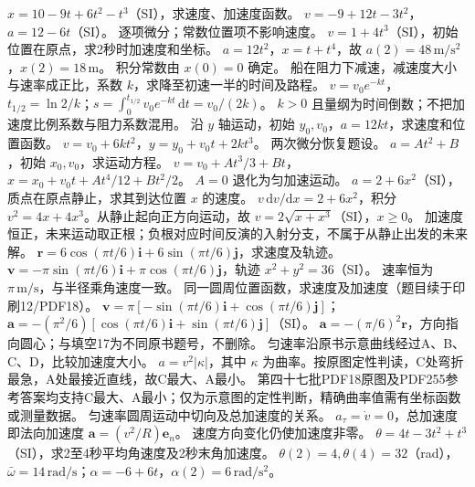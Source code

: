 \problemtext $x=10-9t+6t^2-t^3$（SI），求速度、加速度函数。
\workings $v=-9+12t-3t^2$，$a=12-6t$（SI）。
\crosscheck 逐项微分；常数位置项不影响速度。
\problemtext $v=1+4t^3$（SI），初始位置在原点，求2秒时加速度和坐标。
\workings $a=12t^2$，$x=t+t^4$，故 $a(2)=48\,\mathrm{m/s^2}$，$x(2)=18\,\mathrm m$。
\crosscheck 积分常数由 $x(0)=0$ 确定。
\problemtext 船在阻力下减速，减速度大小与速率成正比，系数 $k$，求降至初速一半的时间及路程。
\workings $v=v_0e^{-kt}$，$t_{1/2}=\ln2/k$；$s=\int_0^{t_{1/2}}v_0e^{-kt}\,\mathrm dt=v_0/(2k)$。
\crosscheck $k>0$ 且量纲为时间倒数；不把加速度比例系数与阻力系数混用。
\problemtext 沿 $y$ 轴运动，初始 $y_0,v_0$，$a=12kt$，求速度和位置函数。
\workings $v=v_0+6kt^2$，$y=y_0+v_0t+2kt^3$。
\crosscheck 两次微分恢复题设。
\problemtext $a=At^2+B$，初始 $x_0,v_0$，求运动方程。
\workings $v=v_0+At^3/3+Bt$，$x=x_0+v_0t+At^4/12+Bt^2/2$。
\crosscheck $A=0$ 退化为匀加速运动。
\problemtext $a=2+6x^2$（SI），质点在原点静止，求其到达位置 $x$ 的速度。
\workings $v\,\mathrm dv/\mathrm dx=2+6x^2$，积分 $v^2=4x+4x^3$。从静止起向正方向运动，故 $v=2\sqrt{x+x^3}$（SI），$x\ge0$。
\crosscheck 加速度恒正，未来运动取正根；负根对应时间反演的入射分支，不属于从静止出发的未来解。
\problemtext $\bm r=6\cos(\pi t/6)\bm i+6\sin(\pi t/6)\bm j$，求速度及轨迹。
\workings $\bm v=-\pi\sin(\pi t/6)\bm i+\pi\cos(\pi t/6)\bm j$，轨迹 $x^2+y^2=36$（SI）。
\crosscheck 速率恒为 $\pi\,\mathrm{m/s}$，与半径乘角速度一致。
\problemtext 同一圆周位置函数，求速度及加速度（题目续于印刷12/PDF18）。
\workings $\bm v=\pi[-\sin(\pi t/6)\bm i+\cos(\pi t/6)\bm j]$；$\bm a=-(\pi^2/6)[\cos(\pi t/6)\bm i+\sin(\pi t/6)\bm j]$（SI）。
\crosscheck $\bm a=-(\pi/6)^2\bm r$，方向指向圆心；与填空17为不同原书题号，不删除。
\problemtext 匀速率沿原书示意曲线经过A、B、C、D，比较加速度大小。
\workings $a=v^2|\kappa|$，其中 $\kappa$ 为曲率。按原图定性判读，C处弯折最急，A处最接近直线，故C最大、A最小。
\crosscheck 第四十七批PDF18原图及PDF255参考答案均支持C最大、A最小；仅为示意图的定性判断，精确曲率值需有坐标函数或测量数据。
\problemtext 匀速率圆周运动中切向及总加速度的关系。
\workings $a_\tau=\dot v=0$，总加速度即法向加速度 $\bm a=(v^2/R)\bm e_n$。
\crosscheck 速度方向变化仍使加速度非零。
\problemtext $\theta=4t-3t^2+t^3$（SI），求2至4秒平均角速度及2秒末角加速度。
\workings $\theta(2)=4,\theta(4)=32$（rad），$\bar\omega=14\,\mathrm{rad/s}$；$\alpha=-6+6t$，$\alpha(2)=6\,\mathrm{rad/s^2}$。
